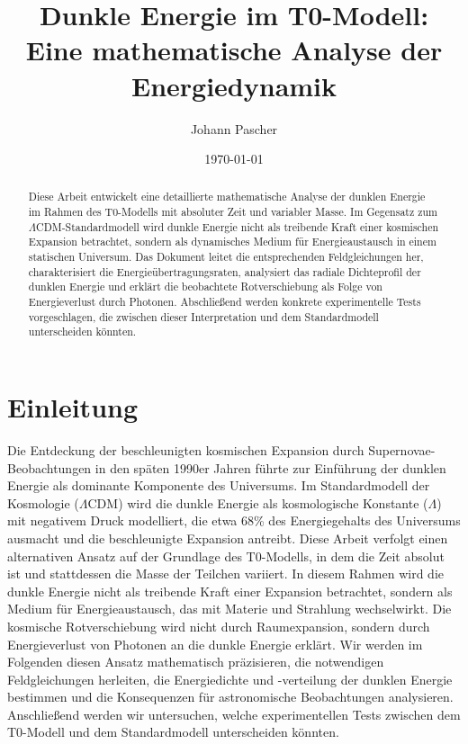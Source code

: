 \documentclass[a4paper,12pt]{article}
\theoremstyle{definition}
\theoremstyle{remark}
\begin{document}
	
	\title{Dunkle Energie im T0-Modell: \\Eine mathematische Analyse der Energiedynamik}
	\author{Johann Pascher}
	\date{\today}
	\maketitle
	
	\begin{abstract}
		Diese Arbeit entwickelt eine detaillierte mathematische Analyse der dunklen Energie im Rahmen des T0-Modells mit absoluter Zeit und variabler Masse. Im Gegensatz zum $\Lambda$CDM-Standardmodell wird dunkle Energie nicht als treibende Kraft einer kosmischen Expansion betrachtet, sondern als dynamisches Medium für Energieaustausch in einem statischen Universum. Das Dokument leitet die entsprechenden Feldgleichungen her, charakterisiert die Energieübertragungsraten, analysiert das radiale Dichteprofil der dunklen Energie und erklärt die beobachtete Rotverschiebung als Folge von Energieverlust durch Photonen. Abschließend werden konkrete experimentelle Tests vorgeschlagen, die zwischen dieser Interpretation und dem Standardmodell unterscheiden könnten.
	\end{abstract}
	
	\tableofcontents
	\newpage
	
	\section{Einleitung}
	
	Die Entdeckung der beschleunigten kosmischen Expansion durch Supernovae-Beobachtungen in den späten 1990er Jahren führte zur Einführung der dunklen Energie als dominante Komponente des Universums. Im Standardmodell der Kosmologie ($\Lambda$CDM) wird die dunkle Energie als kosmologische Konstante ($\Lambda$) mit negativem Druck modelliert, die etwa 68\% des Energiegehalts des Universums ausmacht und die beschleunigte Expansion antreibt. Diese Arbeit verfolgt einen alternativen Ansatz auf der Grundlage des T0-Modells, in dem die Zeit absolut ist und stattdessen die Masse der Teilchen variiert. In diesem Rahmen wird die dunkle Energie nicht als treibende Kraft einer Expansion betrachtet, sondern als Medium für Energieaustausch, das mit Materie und Strahlung wechselwirkt. Die kosmische Rotverschiebung wird nicht durch Raumexpansion, sondern durch Energieverlust von Photonen an die dunkle Energie erklärt. Wir werden im Folgenden diesen Ansatz mathematisch präzisieren, die notwendigen Feldgleichungen herleiten, die Energiedichte und -verteilung der dunklen Energie bestimmen und die Konsequenzen für astronomische Beobachtungen analysieren. Anschließend werden wir untersuchen, welche experimentellen Tests zwischen dem T0-Modell und dem Standardmodell unterscheiden könnten.
	
\end{document}
